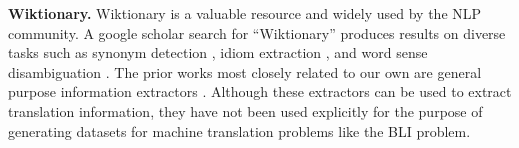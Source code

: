 \documentclass[11pt]{article}
\begin{document}
%
%
%
%

\noindent
\textbf{Wiktionary.}
Wiktionary is a valuable resource and widely used by the NLP community.
A google scholar search for ``Wiktionary'' produces  results on diverse tasks such as synonym detection \citep{navarro2009wiktionary}, idiom extraction \citep{muzny2013automatic}, 
and word sense disambiguation \citep{ben2018wordnet}.
The prior works most closely related to our own are general purpose information extractors \citep[e.g.][]{acs2014pivot,serasset2015dbnary,nastase2015knowitiary,kirov2016very,sajous2020englawi,wu2020wiktionary}.
Although these extractors can be used to extract translation information,
they have not been used explicitly for the purpose of generating datasets for machine translation problems like the BLI problem.
\end{document}
